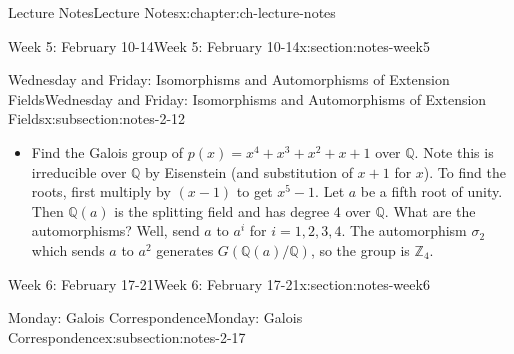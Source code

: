 \documentclass[oneside,11pt,]{book}
\newcommand{\lt}{<}
\begin{document}
\begin{chapterptx}{Lecture Notes}{}{Lecture Notes}{}{}{x:chapter:ch-lecture-notes}
\begin{sectionptx}{Week 5: February 10-14}{}{Week 5: February 10-14}{}{}{x:section:notes-week5}
\begin{subsectionptx}{Wednesday and Friday: Isomorphisms and Automorphisms of Extension Fields}{}{Wednesday and Friday: Isomorphisms and Automorphisms of Extension Fields}{}{}{x:subsection:notes-2-12}
\begin{itemize}[label=\textbullet]
\par
Proceed by induction on the degree of \(p(x)\). If the degree is 1, then \(E = F\) and we are done. Assume the result holds for all polynomials of degree \(k \lt n\) and that \(p(x)\) has degree \(n\).%
\par
Now let \(q(x)\) be an irreducible factor of \(p(x)\) (maybe \(q(x) = p(x)\)), with degree \(m\). The roots of \(q(x)\) lie in \(E\), so pick one of them, call it \(a\). We have%
\begin{equation*}
[E:F(a)] = n/m ~~\text{ and }~~[F(a):F] = m
\end{equation*}
Now \(q(x)\) has exactly \(m\) roots, all of them in \(E\). For each root \(b\) we have an isomorphism from \(F(a)\) to \(F(b)\) which fixes \(F\). So there are \(m\) such isomorphisms.%
\par
Consider \(G(E/F(a))\). This is the set of all automorphisms of \(E\) that fix \(F(a)\). By our inductive hypothesis, we have \(|G(E/F(a))| = [E:F(a)] = n/m\). Each of these composed with an isomorphism between \(F(a)\) and \(F(b)\) gives an element of \(G(E/F)\).%
\item{}Find the Galois group of \(p(x) = x^4 + x^3 + x^2 + x + 1\) over \(\mathbb Q\). Note this is irreducible over \(\mathbb Q\) by Eisenstein (and substitution of \(x+1\) for \(x\)). To find the roots, first multiply by \((x-1)\) to get \(x^5 - 1\). Let \(a\) be a fifth root of unity. Then \(\mathbb Q(a)\) is the splitting field and has degree 4 over \(\mathbb Q\). What are the automorphisms? Well, send \(a\) to \(a^i\) for \(i = 1,2,3,4\). The automorphism \(\sigma_2\) which sends \(a\) to \(a^2\) generates \(G(\mathbb Q(a)/\mathbb Q)\), so the group is \(\mathbb Z_4\).%
\end{itemize}
%
\end{subsectionptx}
\end{sectionptx}
%
%
\typeout{************************************************}
\typeout{************************************************}
%
\begin{sectionptx}{Week 6: February 17-21}{}{Week 6: February 17-21}{}{}{x:section:notes-week6}
%
%
\typeout{************************************************}
\typeout{************************************************}
%
\begin{subsectionptx}{Monday: Galois Correspondence}{}{Monday: Galois Correspondence}{}{}{x:subsection:notes-2-17}

\end{subsectionptx}
\end{sectionptx}
\end{chapterptx}
\end{document}
